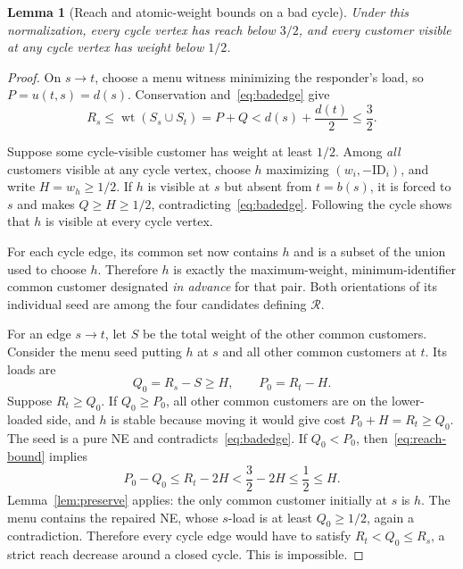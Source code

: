 \documentclass[11pt]{article}
\newtheorem{lemma}[theorem]{Lemma}
\theoremstyle{definition}
\theoremstyle{remark}
\newcommand{\Rmenu}{\mathcal R}
\newcommand{\wt}{\operatorname{wt}}
\begin{document}
\begin{lemma}[Reach and atomic-weight bounds on a bad cycle]\label{lem:heavy}
Under this normalization, every cycle vertex has reach below $3/2$, and every customer visible at any cycle vertex has weight below $1/2$.
\end{lemma}
\begin{proof}
On $s\to t$, choose a menu witness minimizing the responder's load, so $P=u(t,s)=d(s)$. Conservation and~\eqref{eq:badedge} give
\begin{equation}\label{eq:reach-bound}
 R_s\le\wt(S_s\cup S_t)=P+Q<d(s)+\frac{d(t)}2\le\frac32.
\end{equation}

Suppose some cycle-visible customer has weight at least $1/2$. Among \emph{all} customers visible at any cycle vertex, choose $h$ maximizing $(w_i,-\mathrm{ID}_i)$, and write $H=w_h\ge1/2$. If $h$ is visible at $s$ but absent from $t=b(s)$, it is forced to $s$ and makes $Q\ge H\ge1/2$, contradicting~\eqref{eq:badedge}. Following the cycle shows that $h$ is visible at every cycle vertex.

For each cycle edge, its common set now contains $h$ and is a subset of the union used to choose $h$. Therefore $h$ is exactly the maximum-weight, minimum-identifier common customer designated \emph{in advance} for that pair. Both orientations of its individual seed are among the four candidates defining $\Rmenu$.

For an edge $s\to t$, let $S$ be the total weight of the other common customers. Consider the menu seed putting $h$ at $s$ and all other common customers at $t$. Its loads are
\[
 Q_0=R_s-S\ge H,\qquad P_0=R_t-H.
\]
Suppose $R_t\ge Q_0$. If $Q_0\ge P_0$, all other common customers are on the lower-loaded side, and $h$ is stable because moving it would give cost $P_0+H=R_t\ge Q_0$. The seed is a pure NE and contradicts~\eqref{eq:badedge}. If $Q_0<P_0$, then~\eqref{eq:reach-bound} implies
\[
 P_0-Q_0\le R_t-2H<\frac32-2H\le\frac12\le H.
\]
Lemma~\ref{lem:preserve} applies: the only common customer initially at $s$ is $h$. The menu contains the repaired NE, whose $s$-load is at least $Q_0\ge1/2$, again a contradiction. Therefore every cycle edge would have to satisfy $R_t<Q_0\le R_s$, a strict reach decrease around a closed cycle. This is impossible.
\end{proof}
\end{document}
